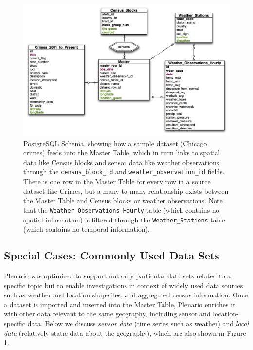 \documentclass[11pt]{article}
\begin{document}
\begin{figure}
	\centering
	\label{fig:db-schema}
	\caption{PostgreSQL Schema, showing how a sample dataset (Chicago crimes) feeds into the Master Table, which in turn links to spatial data like Census blocks and sensor data like weather observations through the \texttt{census\_block\_id} and \texttt{weather\_observation\_id} fields. There is one row in the Master Table for every row in a source dataset like Crimes, but a many-to-many relationship exists between the Master Table and Census blocks or weather observations. Note that the \texttt{Weather\_Observations\_Hourly} table (which contains no spatial information) is filtered through the \texttt{Weather\_Stations} table (which contains no temporal information). \vspace{.4cm}}
	\includegraphics[scale=.45]{db_schema.pdf}
\end{figure}

\subsection{\textbf{Special Cases: Commonly Used Data Sets}}\label{sec:commonly-used-datasets}
Plenario was optimized to support not only particular data sets related to a specific topic but to enable investigations in context of widely used data sources such as weather and location shapefiles, and aggregated census information. Once a dataset is imported and inserted into the Master Table, Plenario enriches it with other data relevant to the same geography, including sensor and location-specific data. Below we discuss \textit{sensor data} (time series such as weather) and \textit{local data} (relatively static data about the geography), which are also shown in Figure \ref{fig:db-schema}.
\end{document}
